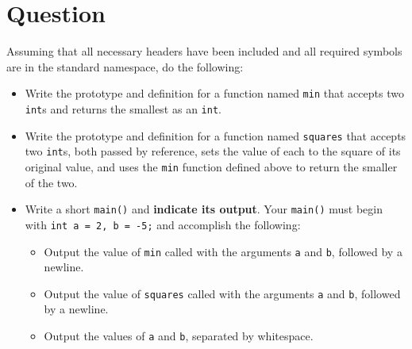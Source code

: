 




\docCopyright

\section{Question}

Assuming that all necessary headers have been included and all required symbols
are in the standard namespace, do the following:

\begin{itemize}

  \item Write the prototype and definition for a function named
    \texttt{min} that accepts two \texttt{int}s and returns
    the smallest as an \texttt{int}.
    \vfill

  \item Write the prototype and definition for a function named
    \texttt{squares} that accepts two \texttt{int}s, both
    passed by reference, sets the value of each to the square of its original
    value, and uses the \texttt{min} function defined above to return
    the smaller of the two.
    \vfill

  \item Write a short \texttt{main()} and \textbf{indicate its
    output}.  Your \texttt{main()} must begin with
    \texttt{int a = 2, b = -5;} and accomplish the following:
    \begin{itemize}
      \item Output the value of \texttt{min} called with the arguments
        \texttt{a} and \texttt{b}, followed by a newline.
      \item Output the value of \texttt{squares} called with the
        arguments \texttt{a} and \texttt{b}, followed by a
        newline.
      \item Output the values of \texttt{a} and \texttt{b},
        separated by whitespace.
    \end{itemize}
    \vfill

\end{itemize}



